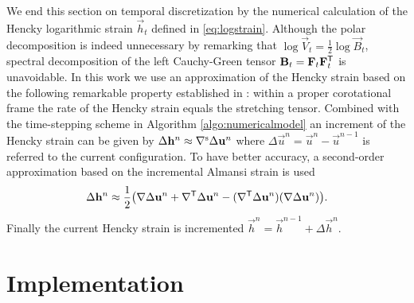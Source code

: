 We end this section on temporal discretization by the numerical calculation of the Hencky logarithmic strain $\vec{h}_t$ defined in \eqref{eq:logstrain}. Although the polar decomposition is indeed unnecessary by remarking that $\log\vec{V}_t=\frac{1}{2}\log\vec{B}_t$, spectral decomposition of the left Cauchy-Green tensor $\vec{B}_t=\vec{F}_t\vec{F}_t^\mT$ is unavoidable. In this work we use an approximation of the Hencky strain based on the following remarkable property established in \cite{XiaoBruhnsMeyers:1997}: within a proper corotational frame the rate of the Hencky strain equals the stretching tensor. Combined with the time-stepping scheme in Algorithm \ref{algo:numericalmodel} an increment of the Hencky strain can be given by $\Delta\vec{h}^n\approx\symgrad\Delta\vec{u}^n$ where $\Delta\vec{u}^n=\vec{u}^n-\vec{u}^{n-1}$ is referred to the current configuration. To have better accuracy, a second-order approximation based on the incremental Almansi strain is used
\[
\Delta\vec{h}^n\approx\frac{1}{2}\bigl(\nabla\Delta\vec{u}^n+\nabla^\mT\Delta\vec{u}^n-(\nabla^\mT\Delta\vec{u}^n)(\nabla\Delta\vec{u}^n)\bigr).
\]
Finally the current Hencky strain is incremented $\vec{h}^n=\vec{h}^{n-1}+\Delta\vec{h}^n$.

\section{Implementation}